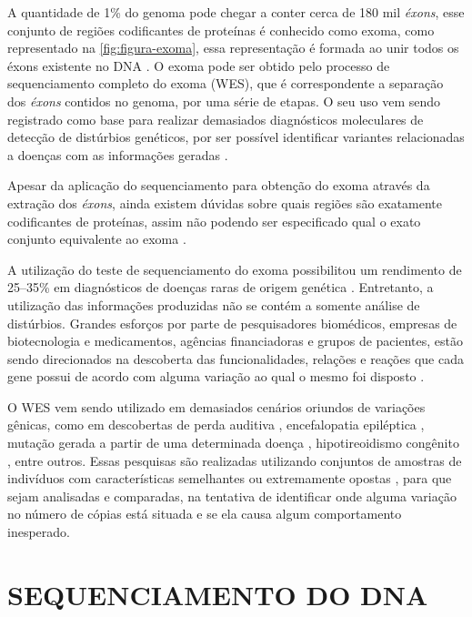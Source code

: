 A quantidade de 1\% do genoma pode chegar a conter cerca de 180 mil \textit{éxons}, esse conjunto de regiões codificantes de proteínas é conhecido como exoma, como representado na \autoref{fig:figura-exoma}, essa representação é formada ao unir todos os éxons existente no DNA \cite{Bamshad2011}. O exoma pode ser obtido pelo processo de sequenciamento completo do exoma (WES), que é correspondente a separação dos \textit{éxons} contidos no genoma, por uma série de etapas. O seu uso vem sendo registrado como base para realizar demasiados diagnósticos moleculares de detecção de distúrbios genéticos, por ser possível identificar variantes relacionadas a doenças com as informações geradas \cite{Bamshad2011,Lee2014,HutchisonIII2007}.

Apesar da aplicação do sequenciamento para obtenção do exoma através da extração dos \textit{éxons}, ainda existem dúvidas sobre quais regiões são exatamente codificantes de proteínas, assim não podendo ser especificado qual o exato conjunto equivalente ao exoma \cite{Bamshad2011}.

A utilização do teste de sequenciamento do exoma possibilitou um rendimento de 25–35\% em diagnósticos de doenças raras de origem genética \cite{Bamshad2011}. Entretanto, a utilização das informações produzidas não se contém a somente análise de distúrbios. Grandes esforços por parte de pesquisadores biomédicos, empresas de biotecnologia e medicamentos, agências financiadoras e grupos de pacientes, estão sendo direcionados na descoberta das funcionalidades, relações e reações que cada gene possui de acordo com alguma variação ao qual o mesmo foi disposto \cite{Antonarakis2006}.

O WES vem sendo utilizado em demasiados cenários oriundos de variações gênicas, como em descobertas de perda auditiva \cite{Likar2018}, encefalopatia epiléptica \cite{Allen2016}, mutação gerada a partir de uma determinada doença \cite{Lin2019}, hipotireoidismo congênito \cite{Fu2019}, entre outros. Essas pesquisas são realizadas utilizando conjuntos de amostras de indivíduos com características semelhantes ou extremamente opostas \cite{Bamshad2011}, para que sejam analisadas e comparadas, na tentativa de identificar onde alguma variação no número de cópias está situada e se ela causa algum comportamento inesperado.

\section{SEQUENCIAMENTO DO DNA} 
\label{sec:sequenciamentoDoDna}

